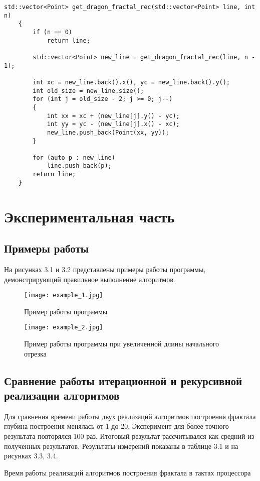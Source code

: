 \documentclass[12pt, a4paper]{report}
\begin{document}
	\begin{lstlisting}[label=some-code,caption=Рекурсивная реализация]
	std::vector<Point> get_dragon_fractal_rec(std::vector<Point> line, int n)
	{
		if (n == 0)
			return line;
	
		std::vector<Point> new_line = get_dragon_fractal_rec(line, n - 1);
	
		int xc = new_line.back().x(), yc = new_line.back().y();
		int old_size = new_line.size();
		for (int j = old_size - 2; j >= 0; j--)
		{
			int xx = xc + (new_line[j].y() - yc);
			int yy = yc - (new_line[j].x() - xc);
			new_line.push_back(Point(xx, yy));
		}
	
		for (auto p : new_line)
			line.push_back(p);
		return line;
	}
	\end{lstlisting}

	\newpage


	\chapter{Экспериментальная часть}
	\section{Примеры работы}
	На рисунках 3.1 и 3.2 представлены примеры работы программы, демонстрирующий правильное выполнение алгоритмов.
	\begin{figure}[ht!]
		\centering
		\texttt{[image: example\_1.jpg]}
		\caption{Пример работы программы}
		\label{fig:example}
	\end{figure}
	\begin{figure}[ht!]
		\centering
		\texttt{[image: example\_2.jpg]}
		\caption{Пример работы программы при увеличенной длины начального отрезка}
		\label{fig:example2}
	\end{figure}
	
	\section{Сравнение работы итерационной и рекурсивной реализации алгоритмов}
	Для сравнения времени работы двух реализаций алгоритмов построения фрактала глубина построения менялась от 1 до 20. Эксперимент для более точного результата повторялся 100 раз. Итоговый результат рассчитывался как средний из полученных результатов. Результаты измерений показаны в таблице 3.1 и на рисунках 3.3, 3.4.\\
	\begin{table}[ht!]
		\caption{Время работы реализаций алгоритмов построения фрактала в тактах процессора}
		\begin{center}
		\end{center}
	\end{table}
	
\end{document}
